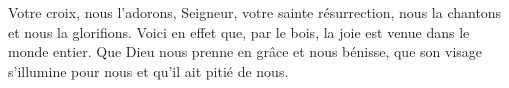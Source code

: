 Votre croix, nous l’adorons, Seigneur, votre sainte résurrection, nous la chantons et nous la glorifions. Voici en effet que, par le bois, la joie est venue dans le monde entier.
\versseparator
Que Dieu nous prenne en grâce et nous bénisse, que son visage s’illumine pour nous et qu’il ait pitié de nous.